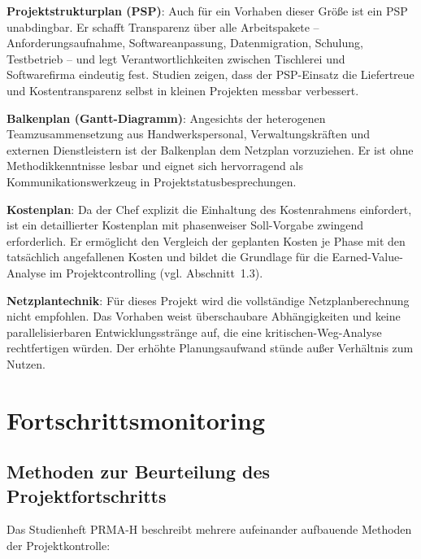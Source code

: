 \documentclass[
    a4paper,
    11pt,
    bibliography=totoc,
    listof=totoc,
    parskip=half,
    headings=normal
]{scrbook}
\begin{document}
\textbf{Projektstrukturplan (PSP)}: Auch für ein Vorhaben dieser Größe ist ein PSP
unabdingbar. Er schafft Transparenz über alle Arbeitspakete -- Anforderungsaufnahme,
Softwareanpassung, Datenmigration, Schulung, Testbetrieb -- und legt Verantwortlichkeiten zwischen Tischlerei und Softwarefirma eindeutig fest. Studien zeigen, dass
der PSP-Einsatz die Liefertreue und Kostentransparenz selbst in kleinen Projekten
messbar verbessert\autocite[vgl.][]{PMI_WBS2006}.

\textbf{Balkenplan (Gantt-Diagramm)}: Angesichts der heterogenen Teamzusammensetzung
aus Handwerkspersonal, Verwaltungskräften und externen Dienstleistern ist der
Balkenplan dem Netzplan vorzuziehen. Er ist ohne Methodikkenntnisse lesbar und eignet
sich hervorragend als Kommunikationswerkzeug in Projektstatusbesprechungen\autocite[vgl.][Kap.~2]{Mayer2014}.

\textbf{Kostenplan}: Da der Chef explizit die Einhaltung des Kostenrahmens
einfordert, ist ein detaillierter Kostenplan mit phasenweiser Soll-Vorgabe
zwingend erforderlich. Er ermöglicht den Vergleich der geplanten Kosten je Phase
mit den tatsächlich angefallenen Kosten und bildet die Grundlage für die
Earned-Value-Analyse im Projektcontrolling (vgl. Abschnitt~1.3).

\textbf{Netzplantechnik}: Für dieses Projekt wird die vollständige Netzplanberechnung
nicht empfohlen. Das Vorhaben weist überschaubare Abhängigkeiten und keine
parallelisierbaren Entwicklungsstränge auf, die eine kritischen-Weg-Analyse
rechtfertigen würden. Der erhöhte Planungsaufwand stünde außer Verhältnis zum Nutzen\autocite[vgl.][Kap.~2]{Mayer2014}.

\section{Fortschrittsmonitoring}

\subsection{Methoden zur Beurteilung des Projektfortschritts}

Das Studienheft PRMA-H beschreibt mehrere aufeinander aufbauende Methoden der
Projektkontrolle\autocite[vgl.][Kap.~3]{Mayer2014}:
\end{document}
